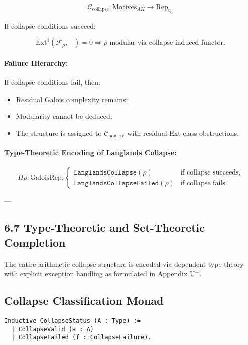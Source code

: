 \documentclass[11pt]{article}
\begin{document}
\[
\mathcal{C}_{\mathrm{collapse}} : \mathrm{Motives}_{AK} \longrightarrow \mathrm{Rep}_{\mathbb{Q}_\ell}
\]

If collapse conditions succeed:

\[
\mathrm{Ext}^1(\mathcal{F}_\rho, -) = 0 \Rightarrow \rho \text{ modular via collapse-induced functor}.
\]

\paragraph{Failure Hierarchy:}
If collapse conditions fail, then:

\begin{itemize}
    \item Residual Galois complexity remains;
    \item Modularity cannot be deduced;
    \item The structure is assigned to \( \mathcal{C}_{\mathrm{nontriv}} \) with residual Ext-class obstructions.
\end{itemize}

\paragraph{Type-Theoretic Encoding of Langlands Collapse:}

\[
\Pi \rho : \mathrm{GaloisRep},
\begin{cases}
\texttt{LanglandsCollapse}(\rho) & \text{if collapse succeeds}, \\
\texttt{LanglandsCollapseFailed}(\rho) & \text{if collapse fails}.
\end{cases}
\]

---

\subsection*{6.7 Type-Theoretic and Set-Theoretic Completion}

The entire arithmetic collapse structure is encoded via dependent type theory with explicit exception handling as formulated in Appendix U$^{+}$.

\subsection*{Collapse Classification Monad}

\begin{lstlisting}[language=Coq]
Inductive CollapseStatus (A : Type) :=
  | CollapseValid (a : A)
  | CollapseFailed (f : CollapseFailure).
\end{lstlisting}
\end{document}
